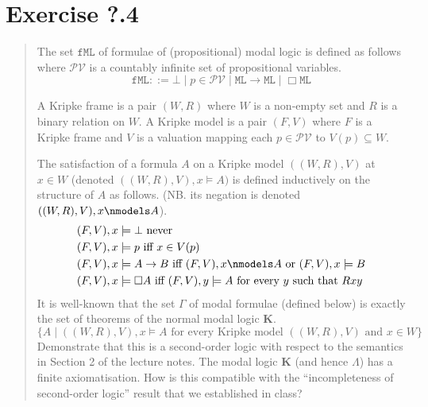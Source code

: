 \documentclass[11pt,a4paper]{article}
\newcommand{\all}{\Box}
\begin{document}
\section*{Exercise ?.4}
\begin{quote}
The set $\mathtt{fML}$ of formulae of (propositional) modal logic is defined as
follows where $\mathcal{PV}$ is a countably infinite set of propositional variables.
\begin{equation*}
\mathtt{fML} ::= \bot \mid p \in \mathcal{PV} \mid \mathtt{ML} \to \mathtt{ML} \mid \all \mathtt{ML}
\end{equation*}

A Kripke frame is a pair $(W, R)$ where $W$ is a non-empty set and $R$ is
a binary relation on $W$. A Kripke model is a pair $(F, V )$ where $F$ is a
Kripke frame and $V$ is a valuation mapping each $p \in \mathcal{PV}$ to $ V(p) \subseteq W$.

The satisfaction of a formula $A$ on a Kripke model $((W, R), V )$ at $x \in
W$ (denoted $((W, R), V ), x  \models A)$ is defined inductively on the structure
of $A$ as follows. (NB. its negation is denoted $((W, R), V ), x \nmodels A$).
\begin{equation*}
\begin{split}
&(F, V ), x \models \bot \text{ never} \\
&(F, V ), x \models p \text{ iff } x \in V(p)\\
&(F, V ), x \models  A \to B \text{ iff }  (F, V ), x \nmodels A \text{ or } (F, V ), x \models B\\
&(F, V ), x \models \all A \text{ iff } (F, V ), y \models A \text{ for every } y \text{ such that } Rxy\\
\end{split}
\end{equation*}
It is well-known that the set $\Gamma$ of modal formulae (defined below) is
exactly the set of theorems of the normal modal logic $\mathbf{K}$.
\begin{equation*}
\{ A \mid ((W, R), V ), x \models A \text{ for every Kripke model } ((W, R), V ) \text{ and } x \in W \}
\end{equation*}
Demonstrate that this is a second-order logic with respect to the semantics in Section 2 of the lecture notes. The modal logic $\mathbf{K}$ (and hence $\Lambda$) has a finite axiomatisation. How is this compatible with the “incompleteness of second-order logic” result that we established in
class?
\end{quote}
\end{document}

